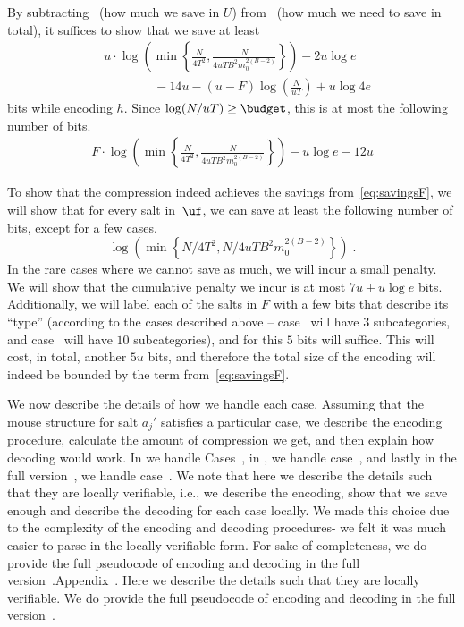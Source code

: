 By subtracting~ (how much we save in $U$) from~ (how much we need to save in total),  
it suffices to show that we save at least
\begin{align*}
 &u\cdot\log\left( \min\left\{\frac{N}{4T^2},\frac{N}{4uTB^2m_0^{2(B-2)}}\right\}\right) -2u\log e \\ &\qquad\qquad  -14u- (u-F)\log \left(\frac{N}{uT}\right) 
 + u\log 4e
 \end{align*}
   bits while encoding $h$.  Since $\log(N/uT)\geq \budget$, this is at most the following number of bits.
   \begin{align}
    F\cdot \log\left(\min\left\{\frac{N}{4T^2},\frac{N}{4uTB^2m_0^{2(B-2)}}\right\}\right)-u\log e-12u \label{eq:savingsF}
   \end{align}

To show that the compression indeed achieves the savings from~\eqref{eq:savingsF}, we will show that for every salt in~$\uf$, we can save at least the following number of bits, except for a few cases.
$$\log\left(\min\left\{N/4T^2,N/4uTB^2m_0^{2(B-2)}\right\}\right)\;.$$
  In the rare cases where we cannot save as much, we will incur a small penalty. We will show that the cumulative penalty we incur is at most $7u+u\log e$  bits. Additionally, we will label each of the salts in $F$ with a few bits that describe its ``type'' (according to the cases described above -- case~ will have $3$ subcategories, and case~ will have $10$ subcategories), and for this $5$ bits will suffice. This will cost, in total, another $5u$ bits, and therefore the total size of the encoding will indeed be bounded by the term from~\eqref{eq:savingsF}.





We now describe the details of how we handle each case. Assuming that the mouse structure for salt $a_j'$ satisfies a particular case, we describe the encoding procedure, calculate the amount of compression we get, and then explain how decoding would work. In  we handle Cases~, in , we handle case~, and lastly in \ifnum{} \else the full version~\cite{full}\fi, we handle case~. 
\ifnum{}
We note that here we describe the details such that they are locally verifiable, i.e., we describe the encoding, show that we save enough and describe the decoding for each case locally. We made this choice due to the complexity of the encoding and decoding procedures- we felt it was much easier to parse in the locally verifiable form. For sake of completeness, we do provide the full pseudocode of encoding and decoding in \ifnum{} the full version~\cite{full}.\else Appendix~.\fi
\else
Here we describe the details such that they are locally verifiable. We do provide the full pseudocode of encoding and decoding in the full version~\cite{full}.
\fi


